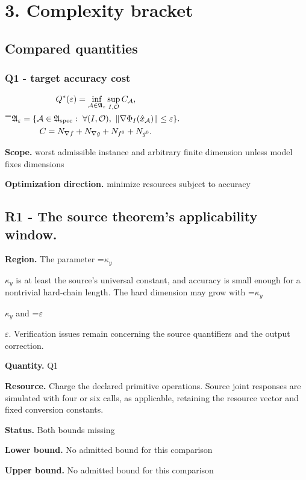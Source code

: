 \documentclass[10pt,a4paper]{article}
\newcommand{\AtlasMath}[1]{\par\begingroup\centering\setbox0=\hbox{$\displaystyle #1$}\ifdim\wd0>1.4\linewidth\typeout{ATLAS WIDE FORMULA: \the\wd0}\fi\ifdim\wd0>\linewidth\resizebox{\linewidth}{!}{\box0}\else\box0\fi\par\endgroup}
\newcommand{\AtlasInlineMath}[1]{\begingroup\setbox0=\hbox{$#1$}\ifdim\wd0>.4\linewidth\endgroup\AtlasMath{#1}\else\endgroup$#1$\fi}
\begin{document}
\section{3. Complexity bracket}
\subsection{Compared quantities}
\subsubsection{Q1 - target accuracy cost}
\AtlasMath{\begin{gathered}Q^*(\varepsilon)=\inf_{\mathcal A\in\mathfrak A_\varepsilon}\sup_{I,\mathcal O}C_{\mathcal A},\\\mathfrak A_\varepsilon=\{\mathcal A\in\mathfrak A_{\rm spec}:\ \forall(I,\mathcal O),\ \|\nabla\Phi_I(\hat x_{\mathcal A})\|\le\varepsilon\}.\\C=N_{\nabla f}+N_{\nabla g}+N_{f^0}+N_{g^0}.\end{gathered}}
\textbf{Scope.} worst admissible instance and arbitrary finite dimension unless model fixes dimensions

\textbf{Optimization direction.} minimize resources subject to accuracy

\subsection{R1 - The source theorem’s applicability window.}
\textbf{Region.} The parameter \AtlasInlineMath{\kappa_y} is at least the source's universal constant, and accuracy is small enough for a nontrivial hard-chain length. The hard dimension may grow with \AtlasInlineMath{\kappa_y} and \AtlasInlineMath{\varepsilon}. Verification issues remain concerning the source quantifiers and the output correction.

\textbf{Quantity.} Q1

\textbf{Resource.} Charge the declared primitive operations. Source joint responses are simulated with four or six calls, as applicable, retaining the resource vector and fixed conversion constants.

\textbf{Status.} Both bounds missing

\textbf{Lower bound.} No admitted bound for this comparison

\textbf{Upper bound.} No admitted bound for this comparison
\end{document}
